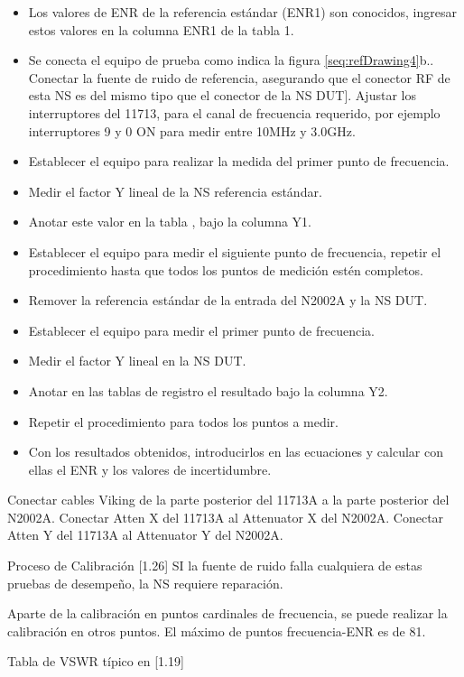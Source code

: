 \begin{itemize}
\item Los valores de ENR de la referencia estándar (ENR1) son conocidos, ingresar estos valores en la columna ENR1 de la
tabla 1.
\item Se conecta el equipo de prueba como indica la figura \ref{seq:refDrawing4}b.. Conectar la fuente de ruido de
referencia, asegurando que el conector RF de esta NS es del mismo tipo que el conector de la NS DUT]. Ajustar los
interruptores del 11713, para el canal de frecuencia requerido, por ejemplo interruptores 9 y 0 ON para medir entre
10MHz y 3.0GHz. 
\item Establecer el equipo para realizar la medida del primer punto de frecuencia. 
\item Medir el factor Y lineal de la NS referencia estándar.
\item Anotar este valor en la tabla , bajo la columna Y1.
\item Establecer el equipo para medir el siguiente punto de frecuencia, repetir el procedimiento hasta que todos los
puntos de medición estén completos.
\item Remover la referencia estándar de la entrada del N2002A y la NS DUT.
\item Establecer el equipo para medir el primer punto de frecuencia.
\item Medir el factor Y lineal en la NS DUT.
\item Anotar en las tablas de registro el resultado bajo la columna Y2.
\item Repetir el procedimiento para todos los puntos a medir.
\item Con los resultados obtenidos, introducirlos en las ecuaciones y calcular con ellas el ENR y los valores de
incertidumbre.
\end{itemize}

Conectar cables Viking de la parte posterior del 11713A a la parte posterior del N2002A. Conectar Atten X del 11713A al Attenuator X del N2002A. Conectar Atten Y del 11713A al Attenuator Y del N2002A.

Proceso de Calibración [1.26]	
SI la fuente de ruido falla cualquiera de estas pruebas de desempeño, la NS requiere reparación.

Aparte de la calibración en puntos cardinales de frecuencia, se puede realizar la calibración en otros puntos. El máximo de puntos frecuencia-ENR es de 81.
	
Tabla de VSWR típico en [1.19]


